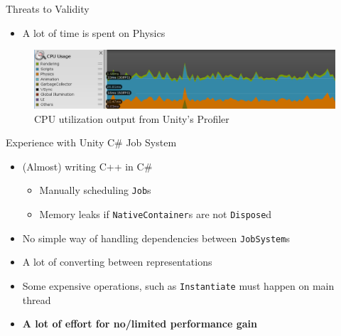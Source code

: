 \begin{frame}{\secname}{\subsecname}
	Threats to Validity
	\begin{itemize}
		\item A lot of time is spent on Physics
	\end{itemize}
	\begin{figure}[h!]
		\centering
		\includegraphics[width=\textwidth]{pictures/profiling.png}
		\caption{CPU utilization output from Unity's Profiler}
		\label{fig:unity:profiler}
	\end{figure}
\end{frame}

\begin{frame}{\secname}{\subsecname}
	Experience with Unity C\# Job System
	\begin{itemize}
		\item (Almost) writing C++ in C\#
		\begin{itemize}
			\item Manually scheduling \texttt{Job}s
			\item Memory leaks if \texttt{NativeContainer}s are not \texttt{Dispose}d
		\end{itemize}
		\item No simple way of handling dependencies between \texttt{JobSystem}s
		\item A lot of converting between representations
		\item Some expensive operations, such as \texttt{Instantiate} must happen on main thread
		\item \textbf{A lot of effort for no/limited performance gain}
	\end{itemize}
\end{frame}
